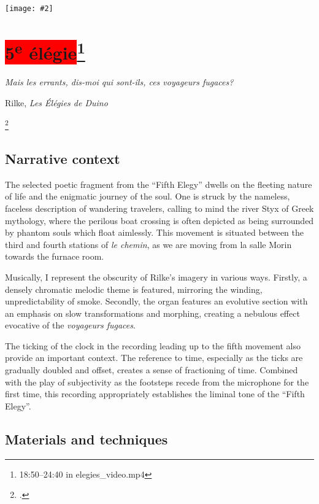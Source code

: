 \documentclass[12pt,twoside,maitrise]{dms_ks}
\newcommand{\customincludeexamples}[4][]{%
    \begin{example}[H]
        \centering
        \texttt{[image: \#2]}
        \caption{#4}
	\label{#3} 
    \end{example}
}
\theoremstyle{definition}
\begin{document}
{\customincludeexamples[width=\textwidth]{4e_6}{ex:4e_6}{The poetic fragment set over held pedal tones and a recording of la salle Morin (p.~12 sys.~1).}
\section{\colorbox{red}{5\textsuperscript{e} élégie}\footnote{18:50--24:40 in elegies\_video.mp4}}

\epigraph{\textit{Mais les errants, dis-moi qui sont-ils, ces voyageurs fugaces?}}{Rilke, \textit{Les Élégies de Duino}\protect\footnotemark}

\footcitetext[47]{rilke_egies_1986}

\subsection{Narrative context}

The selected poetic fragment from the “Fifth Elegy” dwells on the fleeting nature of life and the enigmatic journey of the soul. 
One is struck by the nameless, faceless description of wandering travelers, calling to mind the river Styx of Greek mythology, where the perilous boat crossing is often depicted as being surrounded by phantom souls which float aimlessly. 
This movement is situated between the third and fourth stations of \textit{le chemin}, as we are moving from la salle Morin towards the furnace room. 

Musically, I represent the obscurity of Rilke's imagery in various ways. 
Firstly, a densely chromatic melodic theme is featured, mirroring the winding, unpredictability of smoke. 
Secondly, the organ features an evolutive section with an emphasis on slow transformations and morphing, creating a nebulous effect evocative of the \textit{voyageurs fugaces}. 

The ticking of the clock in the recording leading up to the fifth movement also provide an important context. 
The reference to time, especially as the ticks are gradually doubled and offset, creates a sense of fractioning of time. 
Combined with the play of subjectivity as the footsteps recede from the microphone for the first time, this recording appropriately establishes the liminal tone of the “Fifth Elegy”.

\subsection{Materials and techniques}

}
\end{document}
